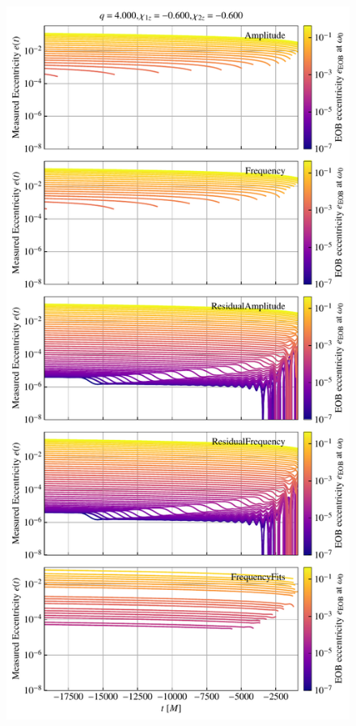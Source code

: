 \documentclass[aps,prd,amsmath,floats,floatfix, twocolumn,
superscriptaddress,nofootinbib,showpacs]{revtex4-1}
\begin{document}
\begin{figure}[thb]
\includegraphics[width=\columnwidth]{test_measured_ecc_vs_time_example}

\end{figure}
\end{document}
